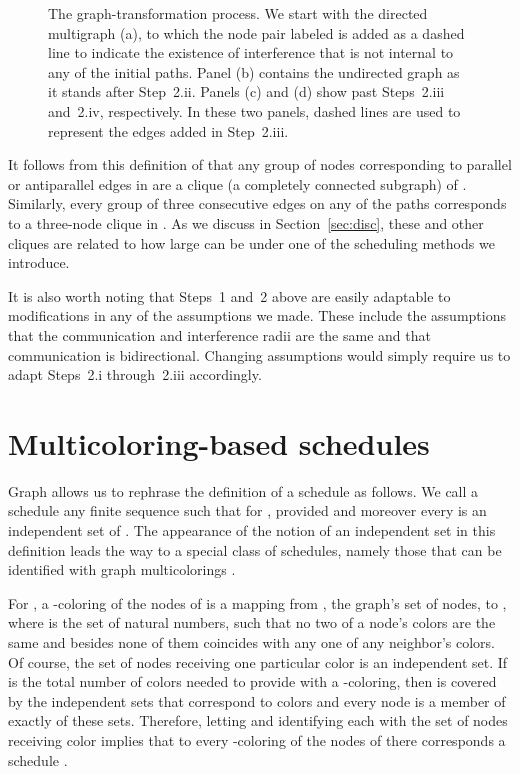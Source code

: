 \documentclass{article}
\begin{document}
\begin{figure}[t]
\centering
{}
\caption{The graph-transformation process. We start with the directed multigraph
 (a), to which the node pair labeled  is added as a dashed line to
indicate the existence of interference that is not internal to any of the
initial  paths. Panel (b) contains the undirected graph  as it stands
after Step~2.ii. Panels (c) and (d) show  past Steps~2.iii and~2.iv,
respectively. In these two panels, dashed lines are used to represent the edges
added in Step~2.iii.}
\label{fig3}
\end{figure}

It follows from this definition of  that any group of nodes corresponding to
parallel or antiparallel edges in  are a clique (a completely connected
subgraph) of . Similarly, every group of three consecutive edges on any of
the paths  corresponds to a
three-node clique in . As we discuss in Section~\ref{sec:disc}, these and
other cliques are related to how large  can be under one of the
scheduling methods we introduce.

It is also worth noting that Steps~1 and~2 above are easily adaptable to
modifications in any of the assumptions we made. These include the assumptions
that the communication and interference radii are the same and that
communication is bidirectional. Changing assumptions would simply require us to
adapt Steps~2.i through~2.iii accordingly.

\section{Multicoloring-based schedules}\label{sec:multic}

Graph  allows us to rephrase the definition of a schedule as follows. We call
a schedule any finite sequence
 such that
 for , provided
 and moreover every  is an independent
set of . The appearance of the notion of an independent set in this
definition leads the way to a special class of schedules, namely those that can
be identified with graph multicolorings \cite{s76}.

For , a -coloring of the nodes of  is a mapping from , the
graph's set of nodes, to , where  is the set of
natural numbers, such that no two of a node's  colors are the same and
besides none of them coincides with any one of any neighbor's  colors. Of
course, the set of nodes receiving one particular color is an independent set.
If  is the total number of colors needed to provide  with a -coloring,
then  is covered by the  independent sets that correspond to colors and
every node is a member of exactly  of these sets. Therefore, letting 
and identifying each  with the set of nodes receiving color 
implies that to every -coloring of the nodes of  there corresponds a
schedule .
\end{document}
